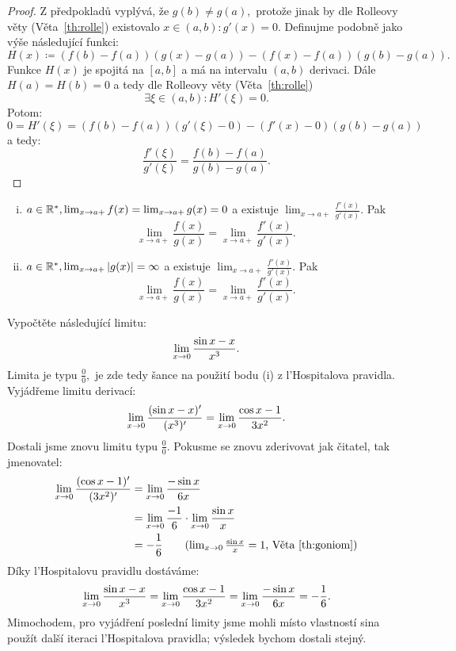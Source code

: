 \begin{proof}
    Z předpokladů vyplývá, že $g(b) \neq g(a), $ protože jinak by dle Rolleovy 
    věty (Věta~\ref{th:rolle}) existovalo $x \in (a,b): g'(x) = 0.$
    Definujme podobně jako výše následující funkci:
    $$H(x) \coloneqq (f(b) - f(a))(g(x)-g(a)) - (f(x) - f(a))(g(b) - g(a)).$$
    Funkce $H(x)$ je spojitá na $[a,b]$ a má na intervalu $(a,b)$ derivaci.
    Dále $H(a) = H(b) = 0$ a tedy dle Rolleovy věty (Věta~\ref{th:rolle})
    $$\exists \xi \in (a,b): H'(\xi) = 0.$$
    Potom:
    $$0 = H'(\xi) = (f(b) - f(a))(g'(\xi) - 0) - (f'(x)-0)(g(b) - g(a))$$
    a tedy:
    $$\frac{f'(\xi)}{g'(\xi)} = \frac{f(b) - f(a)}{g(b) - g(a)}.$$
\end{proof}

\begin{theorem}
    \label{th:lhospital}
    \leavevmode
    \begin{enumerate}[(i)]
        \item \Necht $a \in \mathbb{R}^*, \lim_{x \to a+} f(x) = \lim_{x \to a+} g(x) = 0$
            a \necht existuje $\lim_{x \to a+} \frac{f'(x)}{g'(x)}.$ Pak
            $$ \lim_{x \to a+} \frac{f(x)}{g(x)} = \lim_{x \to a+} \frac{f'(x)}{g'(x)}.$$
        \item \Necht $a \in \mathbb{R}^*, \lim_{x \to a+} |g(x)| = \infty$
            a \necht existuje $\lim_{x \to a+} \frac{f'(x)}{g'(x)}.$ Pak
            $$ \lim_{x \to a+} \frac{f(x)}{g(x)} = \lim_{x \to a+} \frac{f'(x)}{g'(x)}.$$
   \end{enumerate}
\end{theorem}

\begin{remark}
    Vypočtěte následující limitu:
    $$\lim_{x \to 0} \frac{\sin x - x}{x^3}.$$
    Limita je typu $\frac{0}{0}, $ je zde tedy šance na použití bodu (i) z 
    l'Hospitalova pravidla. Vyjádřeme limitu derivací:
    $$\lim_{x \to 0} \frac{(\sin x - x)'}{(x^3)'} = \lim_{x \to 0} \frac{\cos x - 1}{3x^2}.$$
    Dostali jsme znovu limitu typu $\frac{0}{0}.$ Pokusme se znovu zderivovat jak
    čitatel, tak jmenovatel:
    \begin{align*}
        \limxo \frac{(\cos x - 1)'}{(3x^2)'} &= \limxo \frac{-\sin x}{6x} \\
                                             &= \limxo \frac{-1}{6} \cdot \limxo \frac{\sin x}{x} \\
                                             &= -\frac{1}{6} \tag{$\limxo \frac{\sin x}{x} = 1$, Věta~\ref{th:goniom}}
    \end{align*}
    Díky l'Hospitalovu pravidlu dostáváme:
    $$\lim_{x \to 0} \frac{\sin x - x}{x^3} = \lim_{x \to 0} \frac{\cos x - 1}{3x^2} = \lim_{x \to 0} \frac{-\sin x}{6x}  = - \frac{1}{6}.$$
    Mimochodem, pro vyjádření poslední limity jsme mohli místo vlastností sina
    použít další iteraci l'Hospitalova pravidla; výsledek bychom dostali stejný.
\end{remark}

